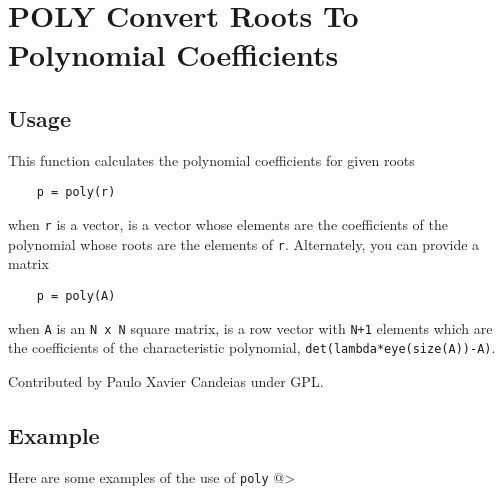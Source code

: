 \section{POLY Convert Roots To Polynomial Coefficients}

\subsection{Usage}

This function calculates the polynomial coefficients for given roots
\begin{verbatim}
    p = poly(r)
\end{verbatim}
when \verb|r| is a vector, is a vector whose elements are the coefficients 
of the polynomial whose roots are the elements of \verb|r|.  Alternately,
you can provide a matrix
\begin{verbatim}
    p = poly(A)
\end{verbatim}
when \verb|A| is an \verb|N x N| square matrix, is a row vector with 
\verb|N+1| elements which are the coefficients of the
characteristic polynomial, \verb|det(lambda*eye(size(A))-A)|.

Contributed by Paulo Xavier Candeias under GPL.
\subsection{Example}

Here are some examples of the use of \verb|poly|
@>
